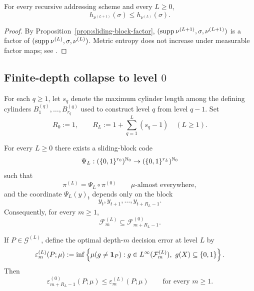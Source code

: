 \begin{corollary}
\label{cor:entropy-monotonicity}
For every recursive addressing scheme and every \(L\geq 0\),
\[
  h_{\nu^{(L+1)}}(\sigma)\leq h_{\nu^{(L)}}(\sigma).
\]
\end{corollary}

\begin{proof}
By Proposition~\ref{prop:sliding-block-factor},
\((\operatorname{supp}\nu^{(L+1)},\sigma,\nu^{(L+1)})\) is a factor of
\((\operatorname{supp}\nu^{(L)},\sigma,\nu^{(L)})\).  Metric entropy does not increase
under measurable factor maps; see \citet[Chapter~4]{WaltersErgodicTheory}.
\end{proof}

\subsection{Finite-depth collapse to level \texorpdfstring{$0$}{0}}

\begin{definition}
\label{def:cumulative-prefix-budget}
For each \(q\geq 1\), let \(s_q\) denote the maximum cylinder length
among the defining cylinders \(B^{(q)}_1,\ldots,B^{(q)}_{r_q}\) used to
construct level \(q\) from level \(q-1\).  Set
\[
  R_0:=1,
  \qquad
  R_L:=1+\sum_{q=1}^{L}(s_q-1)
  \quad(L\geq 1).
\]
\end{definition}

\begin{theorem}
\label{thm:finite-depth-collapse}
For every \(L\geq 0\) there exists a sliding-block code
\[
  \Psi_L:(\{0,1\}^{r_0})^{\mathbb{N}_0}
  \to (\{0,1\}^{r_L})^{\mathbb{N}_0}
\]
such that
\[
  \pi^{(L)}=\Psi_L\circ\pi^{(0)}
  \qquad \mu\text{-almost everywhere},
\]
and the coordinate \(\Psi_L(y)_t\) depends only on the block
\[
  y_t,y_{t+1},\ldots,y_{t+R_L-1}.
\]
Consequently, for every \(m\geq 1\),
\[
  \mathcal{F}_m^{(L)}\subseteq \mathcal{F}_{m+R_L-1}^{(0)}.
\]

If \(P\in\mathcal{G}^{(L)}\), define the optimal depth-\(m\) decision
error at level \(L\) by
\[
  \varepsilon_m^{(L)}(P;\mu)
  := \inf\left\{
      \mu(g\neq\mathbf{1}_P):
      g\in L^\infty(\mathcal{F}_m^{(L)}),\ g(X)\subseteq\{0,1\}
     \right\}.
\]
Then
\[
  \varepsilon_{m+R_L-1}^{(0)}(P;\mu)
  \leq \varepsilon_m^{(L)}(P;\mu)
  \qquad\text{for every } m\geq 1.
\]
\end{theorem}

